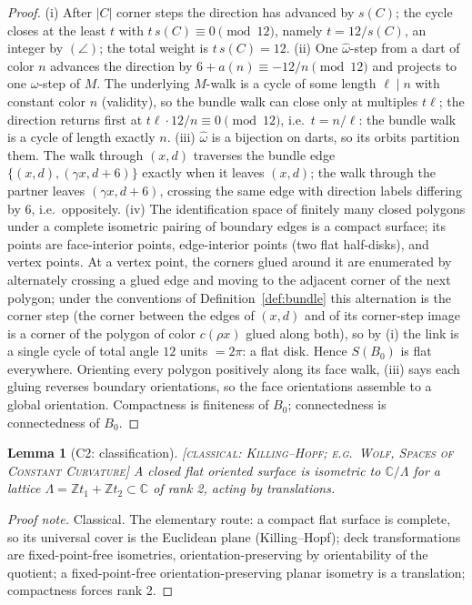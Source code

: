 \documentclass[11pt]{article}
\newtheorem{lemma}[theorem]{Lemma}
\theoremstyle{definition}
\newcommand{\CLASSICAL}[1]{\textnormal{\textsc{[classical: #1]}}}
\newcommand{\C}{\mathbb{C}}
\newcommand{\Z}{\mathbb{Z}}
\begin{document}
\begin{proof}
(i) After $|C|$ corner steps the direction has advanced by $s(C)$; the cycle closes at
the least $t$ with $t\,s(C) \equiv 0 \pmod{12}$, namely $t = 12/s(C)$, an integer by
$(\angle)$; the total weight is $t \, s(C) = 12$.
(ii) One $\hat\omega$-step from a dart of color $n$ advances the direction by
$6 + a(n) \equiv -12/n \pmod{12}$ and projects to one $\omega$-step of $M$. The
underlying $M$-walk is a cycle of some length $\ell \mid n$ with constant color $n$
(validity), so the bundle walk can close only at multiples $t\ell$; the direction
returns first at $t\ell \cdot 12/n \equiv 0 \pmod{12}$, i.e.\ $t = n/\ell$: the bundle
walk is a cycle of length exactly $n$.
(iii) $\hat\omega$ is a bijection on darts, so its orbits partition them. The walk
through $(x,d)$ traverses the bundle edge $\{(x,d), (\gamma x, d{+}6)\}$ exactly when it
leaves $(x,d)$; the walk through the partner leaves $(\gamma x, d+6)$, crossing the same
edge with direction labels differing by $6$, i.e.\ oppositely.
(iv) The identification space of finitely many closed polygons under a complete
isometric pairing of boundary edges is a compact surface; its points are face-interior
points, edge-interior points (two flat half-disks), and vertex points. At a vertex
point, the corners glued around it are enumerated by alternately crossing a glued edge
and moving to the adjacent corner of the next polygon; under the conventions of
Definition~\ref{def:bundle} this alternation is the corner step (the corner between the
edges of $(x,d)$ and of its corner-step image is a corner of the polygon of color
$c(\rho x)$ glued along both), so by (i) the link is a single cycle of total angle $12$
units $= 2\pi$: a flat disk. Hence $S(B_0)$ is flat everywhere. Orienting every polygon
positively along its face walk, (iii) says each gluing reverses boundary orientations,
so the face orientations assemble to a global orientation. Compactness is finiteness of
$B_0$; connectedness is connectedness of $B_0$.
\end{proof}

\begin{lemma}[C2: classification]\label{lem:C2}
\CLASSICAL{Killing--Hopf; e.g.\ Wolf, \emph{Spaces of Constant Curvature}}\;
A closed flat oriented surface is isometric to $\C/\Lambda$ for a lattice
$\Lambda = \Z t_1 + \Z t_2 \subset \C$ of rank 2, acting by translations.
\end{lemma}

\begin{proof}[Proof note]
Classical. The elementary route: a compact flat surface is complete, so its universal
cover is the Euclidean plane (Killing--Hopf); deck transformations are fixed-point-free
isometries, orientation-preserving by orientability of the quotient; a
fixed-point-free orientation-preserving planar isometry is a translation; compactness
forces rank 2.
\end{proof}
\end{document}
